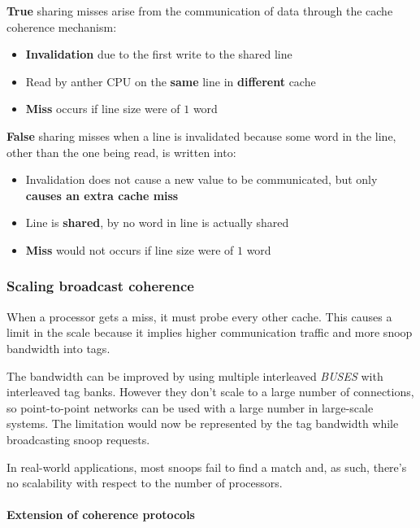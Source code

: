\documentclass[english]{article}
\begin{document}
\bigskip
\textbf{True} sharing misses arise from the communication of data through the cache coherence mechanism:

\begin{itemize}
  \item \textbf{Invalidation} due to the first write to the shared line
  \item Read by anther CPU on the \textbf{same} line in \textbf{different} cache
  \item \textbf{Miss} occurs if line size were of \(1\) word
\end{itemize}

\textbf{False} sharing misses when a line is invalidated because some word in the line, other than the one being read, is written into:

\begin{itemize}
  \item Invalidation does not cause a new value to be communicated, but only \textbf{causes an extra cache miss}
  \item Line is \textbf{shared}, by no word in line is actually shared
  \item \textbf{Miss} would not occurs if line size were of \(1\) word
\end{itemize}

\subsubsection{Scaling broadcast coherence}

When a processor gets a miss, it must probe every other cache.
This causes a limit in the scale because it implies higher communication traffic and more snoop bandwidth into tags.

The bandwidth can be improved by using multiple interleaved \textit{BUSES} with interleaved tag banks.
However they don't scale to a large number of connections, so point-to-point networks can be used with a large number in large-scale systems.
The limitation would now be represented by the tag bandwidth while broadcasting snoop requests.

In real-world applications, most snoops fail to find a match and, as such, there's no scalability with respect to the number of processors.

\paragraph{Extension of coherence protocols}
\end{document}
